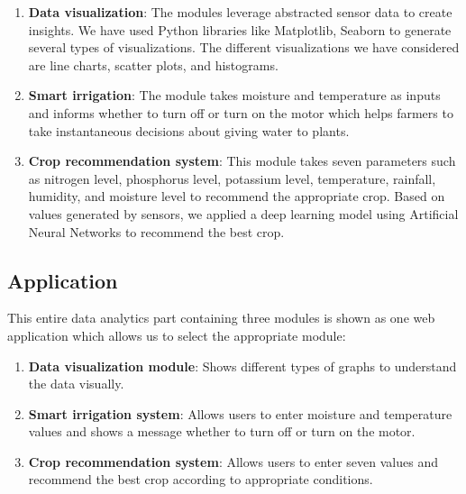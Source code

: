 \documentclass{article}
\begin{document}
\begin{enumerate}
    \item \textbf{Data visualization}: The modules leverage abstracted sensor data to create insights. We have used Python libraries like Matplotlib, Seaborn to generate several types of visualizations. The different visualizations we have considered are line charts, scatter plots, and histograms.
    
    \item \textbf{Smart irrigation}: The module takes moisture and temperature as inputs and informs whether to turn off or turn on the motor which helps farmers to take instantaneous decisions about giving water to plants.
    
    \item \textbf{Crop recommendation system}: This module takes seven parameters such as nitrogen level, phosphorus level, potassium level, temperature, rainfall, humidity, and moisture level to recommend the appropriate crop. Based on values generated by sensors, we applied a deep learning model using Artificial Neural Networks to recommend the best crop.
\end{enumerate}

\subsection{Application}

This entire data analytics part containing three modules is shown as one web application which allows us to select the appropriate module:

\begin{enumerate}
    \item \textbf{Data visualization module}: Shows different types of graphs to understand the data visually.
    
    \item \textbf{Smart irrigation system}: Allows users to enter moisture and temperature values and shows a message whether to turn off or turn on the motor.
    
    \item \textbf{Crop recommendation system}: Allows users to enter seven values and recommend the best crop according to appropriate conditions.
\end{enumerate}
\end{document}

